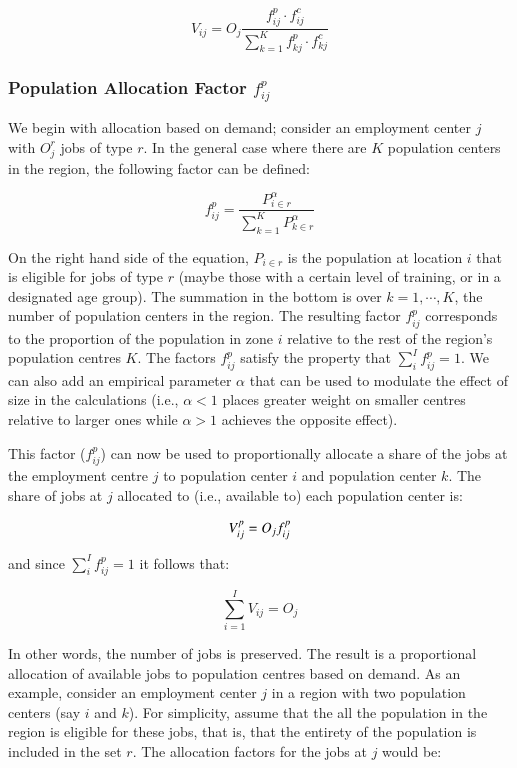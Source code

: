 \documentclass[]{elsarticle} %
\begin{document}
\begin{equation}
\label{eq:spatial-availability}
V_{ij} = O_j\frac{f^p_{ij} \cdot f^c_{ij}}{\sum_{k=1}^K f^p_{kj} \cdot f^c_{kj}}
\end{equation}

\hypertarget{population-allocation-factor-fp_ij}{%
\subsubsection{\texorpdfstring{Population Allocation Factor
\(f^p_{ij}\)}{Population Allocation Factor f\^{}p\_\{ij\}}}\label{population-allocation-factor-fp_ij}}

We begin with allocation based on demand; consider an employment center
\(j\) with \(O_j^r\) jobs of type \(r\). In the general case where there
are \(K\) population centers in the region, the following factor can be
defined:

\[
f^p_{ij} = \frac{P_{i\in r}^\alpha}{\sum_{k=1}^K P_{k\in r}^\alpha}
\]

\noindent On the right hand side of the equation, \(P_{i\in r}\) is the
population at location \(i\) that is eligible for jobs of type \(r\)
(maybe those with a certain level of training, or in a designated age
group). The summation in the bottom is over \(k=1,\cdots,K\), the number
of population centers in the region. The resulting factor \(f^p_{ij}\)
corresponds to the proportion of the population in zone \(i\) relative
to the rest of the region's population centres \(K\). The factors
\(f^p_{ij}\) satisfy the property that \(\sum_i^{I} f^p_{ij} = 1\). We
can also add an empirical parameter \(\alpha\) that can be used to
modulate the effect of size in the calculations (i.e., \(\alpha <1\)
places greater weight on smaller centres relative to larger ones while
\(\alpha>1\) achieves the opposite effect).

This factor (\(f^p_{ij}\)) can now be used to proportionally allocate a
share of the jobs at the employment centre \(j\) to population center
\(i\) and population center \(k\). The share of jobs at \(j\) allocated
to (i.e., available to) each population center is:

\[
V^p_{ij} = O_jf^p_{ij}\\
\]

\noindent and since \(\sum_i^{I} f^p_{ij} = 1\) it follows that:

\[
\sum_{i=1}^I V_{ij} = O_j 
\]

In other words, the number of jobs is preserved. The result is a
proportional allocation of available jobs to population centres based on
demand. As an example, consider an employment center \(j\) in a region
with two population centers (say \(i\) and \(k\)). For simplicity,
assume that the all the population in the region is eligible for these
jobs, that is, that the entirety of the population is included in the
set \(r\). The allocation factors for the jobs at \(j\) would be:
\end{document}
